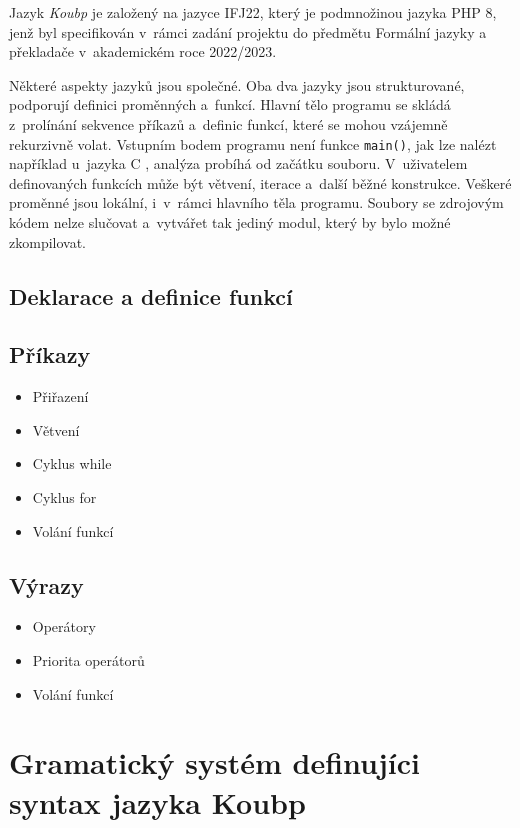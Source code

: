 Jazyk \emph{Koubp} je založený na jazyce IFJ22, který je podmnožinou jazyka PHP 8, jenž byl specifikován v~rámci zadání projektu do předmětu Formální jazyky a překladače v~akademickém roce 2022/2023.

Některé aspekty jazyků jsou společné. 
Oba dva jazyky jsou strukturované, podporují definici proměnných a~funkcí.
Hlavní tělo programu se skládá z~prolínání sekvence příkazů a~definic funkcí, které se mohou vzájemně rekurzivně volat.
Vstupním bodem programu není funkce \texttt{main()}, jak lze nalézt například u~jazyka C \cite{ISO-C-Standard}, analýza probíhá od začátku souboru.
V~uživatelem definovaných funkcích může být větvení, iterace a~další běžné konstrukce.
Veškeré proměnné jsou lokální, i~v~rámci hlavního těla programu.
Soubory se zdrojovým kódem nelze slučovat a~vytvářet tak jediný modul, který by bylo možné zkompilovat.

\subsection*{Deklarace a definice funkcí}

\subsection*{Příkazy}

\begin{itemize}
    \item Přiřazení
    \item Větvení
    \item Cyklus while
    \item Cyklus for
    \item Volání funkcí
\end{itemize}


\subsection*{Výrazy}

\begin{itemize}
    \item Operátory
    \item Priorita operátorů
    \item Volání funkcí
\end{itemize}

\section{Gramatický systém definujíci syntax jazyka Koubp}
